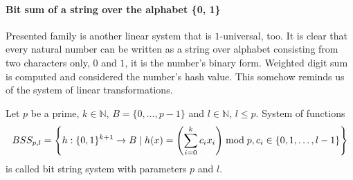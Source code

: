 \paragraph{Bit sum of a string over the alphabet \{0, 1\}}
Presented family is another linear system that is $1$-universal, too. It is clear that every natural number can be written as a string over alphabet consisting from two characters only, $0$ and $1$, it is the number's binary form. Weighted digit sum is computed and considered the number's hash value. This somehow reminds us of the system of linear transformations.

\begin{definition}
Let $p$ be a prime, $k \in \mathbb{N}$, $B = \{0, \dots, p - 1 \}$ and $l \in \mathbb{N}$, $l \leq p$. System of functions
\begin{displaymath}
BSS_{p, l} = \left\{ h: \{0, 1\}^{k + 1} \rightarrow B \mid h(x) = \left(\displaystyle \sum_{i=0}^{k} c_i x_i\right) \bmod p, c_i \in \{0, 1, \dots, l - 1\} \right\}
\end{displaymath} 
is called bit string system with parameters $p$ and $l$.
\end{definition}

